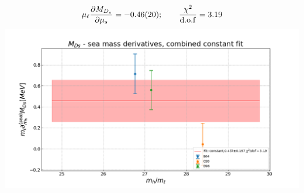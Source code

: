 \documentclass[xcolor={dvipsnames,table}]{beamer}
\begin{document}
\begin{frame}
\begin{columns}
\begin{column}{0.5\textwidth}
        \vspace*{-0.8cm} \,\\
        {\small $$\mu_\ell \frac{\partial M_{D_s}}{\partial \mu_s} = -0.46(20); \qquad\frac{\chi^2}{\rm d.o.f}= 3.19$$}
        \includegraphics[trim=0cm 0.5cm 0cm 1.3cm, clip,width=\textwidth]{plots/const_fit_MD_der_ms.png}
       \end{column}
   \end{columns}
\end{frame}
\end{document}
